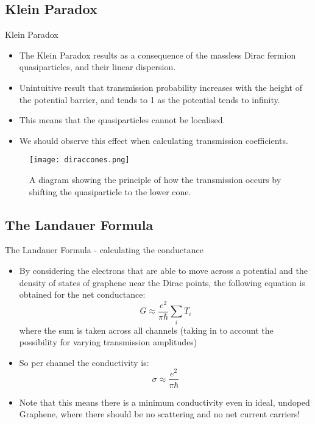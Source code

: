 \documentclass{beamer}
\begin{document}
\subsection{Klein Paradox}
\begin{frame}[t]{Klein Paradox}
\begin{itemize}
\item The Klein Paradox results as a consequence of the massless Dirac fermion quasiparticles, and their linear dispersion.
\item Unintuitive result that transmission probability increases with the height of the potential barrier, and tends to 1 as the potential tends to infinity.
\item This means that the quasiparticles cannot be localised.
\item We should observe this effect when calculating transmission coefficients.
\end{itemize}
\begin{figure}[c]
\texttt{[image: diraccones.png]}
\caption{A diagram showing the principle of how the transmission occurs by shifting the quasiparticle to the lower cone.}
\end{figure}
\end{frame}

\subsection{The Landauer Formula}
\begin{frame}[t]{The Landauer Formula - calculating the conductance}
\begin{itemize}
\item By considering the electrons that are able to move across a potential and the density of states of graphene near the Dirac points, the following equation is obtained for the net conductance:
\begin{equation}
G \approx \frac{e^2}{\pi \hbar} \sum_i T_i
\end{equation}
where the sum is taken across all channels (taking in to account the possibility for varying transmission amplitudes)
\item So per channel the conductivity is:
\begin{equation}
\sigma \approx \frac{e^2}{\pi \hbar}
\end{equation}
\item Note that this means there is a minimum conductivity even in ideal, undoped Graphene, where there should be no scattering and no net current carriers!
\end{itemize}
\end{frame}
\end{document}
